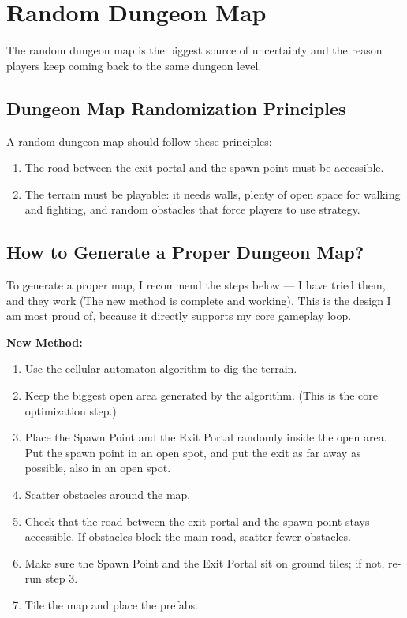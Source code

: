 \section{Random Dungeon Map}

The random dungeon map is the biggest source of uncertainty and the reason players keep coming back to the same dungeon level.

\subsection{Dungeon Map Randomization Principles}

A random dungeon map should follow these principles:

\begin{enumerate}
  \item The road between the exit portal and the spawn point must be accessible.
  \item The terrain must be playable: it needs walls, plenty of open space for walking and fighting, and random obstacles that force players to use strategy.
\end{enumerate}

\subsection{How to Generate a Proper Dungeon Map?}

To generate a proper map, I recommend the steps below --- I have tried them, and they work (The new method is complete and working). This is the design I am most proud of, because it directly supports my core gameplay loop.

\textbf{New Method:}

\begin{enumerate}
  \item Use the cellular automaton algorithm to dig the terrain.
  \item Keep the biggest open area generated by the algorithm. (This is the core optimization step.)
  \item Place the Spawn Point and the Exit Portal randomly inside the open area. Put the spawn point in an open spot, and put the exit as far away as possible, also in an open spot.
  \item Scatter obstacles around the map.
  \item Check that the road between the exit portal and the spawn point stays accessible. If obstacles block the main road, scatter fewer obstacles.
  \item Make sure the Spawn Point and the Exit Portal sit on ground tiles; if not, re-run step 3.
  \item Tile the map and place the prefabs.
\end{enumerate}

